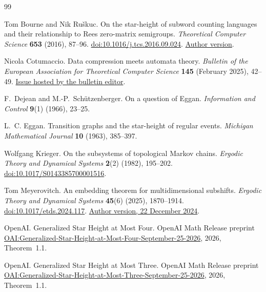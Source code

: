\begin{thebibliography}{99}

Tom Bourne and Nik Ru\v{s}kuc.
On the star-height of subword counting languages and their relationship
to Rees zero-matrix semigroups.
\emph{Theoretical Computer Science} \textbf{653} (2016), 87--96.
\href{https://doi.org/10.1016/j.tcs.2016.09.024}{doi:10.1016/j.tcs.2016.09.024}.
\href{https://arxiv.org/abs/1603.06236v2}{Author version}.

Nicola Cotumaccio.
Data compression meets automata theory.
\emph{Bulletin of the European Association for Theoretical Computer Science}
\textbf{145} (February 2025), 42--49.
\href{https://schmiste.github.io/beatcs145.pdf}{Issue hosted by the bulletin editor}.

F.\ Dejean and M.-P.\ Sch\"utzenberger.
On a question of Eggan.
\emph{Information and Control} \textbf{9}(1) (1966), 23--25.

L.\ C. Eggan.
Transition graphs and the star-height of regular events.
\emph{Michigan Mathematical Journal} \textbf{10} (1963), 385--397.

Wolfgang Krieger.
On the subsystems of topological Markov chains.
\emph{Ergodic Theory and Dynamical Systems} \textbf{2}(2) (1982), 195--202.
\href{https://doi.org/10.1017/S0143385700001516}{doi:10.1017/S0143385700001516}.

Tom Meyerovitch.
An embedding theorem for multidimensional subshifts.
\emph{Ergodic Theory and Dynamical Systems} \textbf{45}(6) (2025), 1870--1914.
\href{https://doi.org/10.1017/etds.2024.117}{doi:10.1017/etds.2024.117}.
\href{https://arxiv.org/abs/2312.05650v5}{Author version, 22 December 2024}.

OpenAI.
Generalized Star Height at Most Four.
OpenAI Math Release preprint
\href{https://github.com/openai/math/blob/main/preprints/Generalized-Star-Height-at-Most-Four-September-25-2026/Generalized-Star-Height-at-Most-Four-September-25-2026.pdf}{OAI:Generalized-Star-Height-at-Most-Four-September-25-2026},
2026, Theorem~1.1.

OpenAI.
Generalized Star Height at Most Three.
OpenAI Math Release preprint
\href{https://github.com/openai/math/blob/main/preprints/Generalized-Star-Height-at-Most-Three-September-25-2026/article.pdf}{OAI:Generalized-Star-Height-at-Most-Three-September-25-2026},
2026, Theorem~1.1.


\end{thebibliography}
